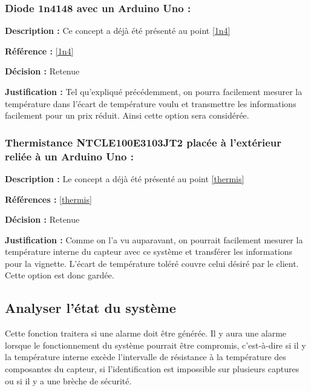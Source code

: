 \subsubsection{Diode 1n4148 avec un Arduino Uno :}
\textbf{Description :} Ce concept a déjà été présenté au point \ref{1n4}

\textbf{Référence :} \ref{1n4}

\textbf{Décision :} Retenue

\textbf{Justification :} Tel qu'expliqué précédemment, on pourra facilement mesurer la température dans l'écart de température voulu et transmettre les informations facilement pour un prix réduit. Ainsi cette option sera considérée. 

\subsubsection{Thermistance NTCLE100E3103JT2 placée à l’extérieur reliée à un Arduino Uno :}
\textbf{Description :} Le concept a déjà été présenté au point \ref{thermis}

\textbf{Références :} \ref{thermis}

\textbf{Décision :} Retenue

\textbf{Justification :} Comme on l'a vu auparavant, on pourrait facilement mesurer la température interne du capteur avec ce système et transférer les informations pour la vignette. L'écart de température toléré couvre celui désiré par le client. Cette option est donc gardée.

\begin{table}[!htb]
\footnotesize
\centering
{}
\end{table}


\subsection{Analyser l'état du système}
Cette fonction traitera si une alarme doit être générée. Il y aura une alarme lorsque le fonctionnement du système pourrait être compromis, c'est-à-dire si il y la température interne excède l'intervalle de résistance à la température des composantes du capteur, si l'identification est impossible sur plusieurs captures ou si il y a une brèche de sécurité.
